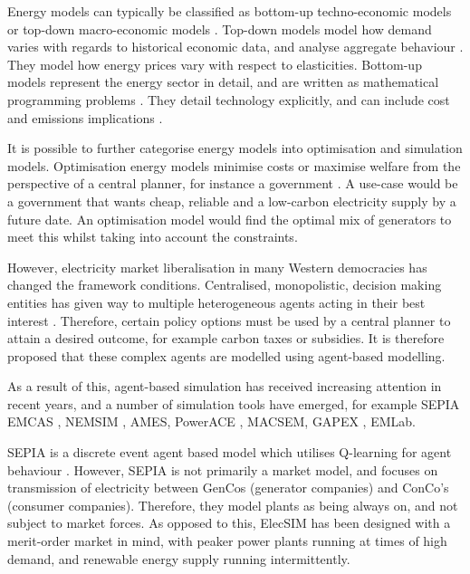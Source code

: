 
Energy models can typically be classified as bottom-up techno-economic models or top-down macro-economic models \cite{Bohringer1998}. Top-down models model how demand varies with regards to historical economic data, and analyse aggregate behaviour \cite{Hall2016}. They model how energy prices vary with respect to elasticities. Bottom-up models represent the energy sector in detail, and are written as mathematical programming problems \cite{Gargiulo2013}. They detail technology explicitly, and can include cost and emissions implications \cite{Hall2016}.

It is possible to further categorise energy models into optimisation and simulation models. Optimisation energy models minimise costs or maximise welfare from the perspective of a central planner, for instance a government \cite{Keles2017}. A use-case would be a government that wants cheap, reliable and a low-carbon electricity supply by a future date. An optimisation model would find the optimal mix of generators to meet this whilst taking into account the constraints. 

However, electricity market liberalisation in many Western democracies has changed the framework conditions. Centralised, monopolistic, decision making entities has given way to multiple heterogeneous agents acting in their best interest \cite{Most2010}. Therefore, certain policy options must be used by a central planner to attain a desired outcome, for example carbon taxes or subsidies. It is therefore proposed that these complex agents are modelled using agent-based modelling.

As a result of this, agent-based simulation has received increasing attention in recent years, and a number of simulation tools have emerged, for example SEPIA\cite{Kraan2018} EMCAS \cite{Conzelmann}, NEMSIM \cite{Batten2006}, AMES\cite{Sun2007}, PowerACE \cite{Rothengatter2007}, MACSEM, GAPEX  \cite{Cincotti2013}, EMLab\cite{Chappin2017}.

SEPIA is a discrete event agent based model which utilises Q-learning for agent behaviour \cite{Harp2000}. However, SEPIA is not primarily a market model, and focuses on transmission of electricity between GenCos (generator companies) and ConCo's (consumer companies). Therefore, they model plants as being always on, and not subject to market forces. As opposed to this, ElecSIM has been designed with a merit-order market in mind, with peaker power plants running at times of high demand, and renewable energy supply running intermittently.

